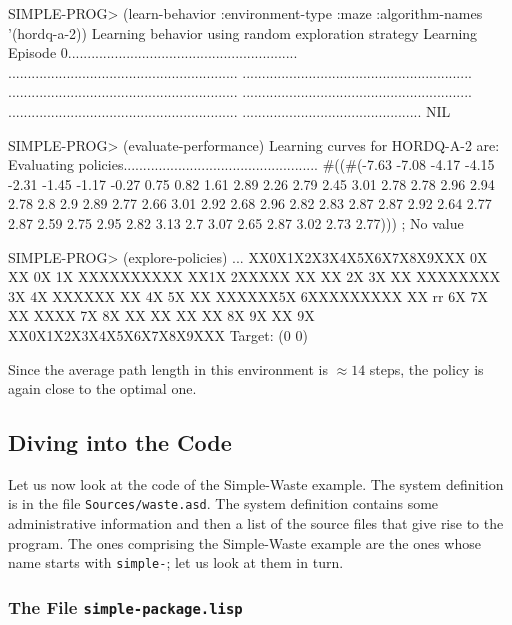 \documentclass[a4paper]{amsart}
\begin{document}
\begin{Code}
  SIMPLE-PROG> (learn-behavior :environment-type :maze :algorithm-names '(hordq-a-2))
  Learning behavior using random exploration strategy
  Learning
  Episode
  0...........................................................
   ...........................................................
   ...........................................................
   ...........................................................
   ...........................................................
   ...........................................................
   ..............................................
  NIL

  SIMPLE-PROG> (evaluate-performance)  
  Learning curves for HORDQ-A-2 are:
  Evaluating policies..................................................
  #((#(-7.63 -7.08 -4.17 -4.15 -2.31 -1.45
       -1.17 -0.27 0.75 0.82 1.61 2.89
       2.26 2.79 2.45 3.01 2.78 2.78 2.96
       2.94 2.78 2.8 2.9 2.89 2.77 2.66
       3.01 2.92 2.68 2.96 2.82 2.83 2.87
       2.87 2.92 2.64 2.77 2.87 2.59 2.75
       2.95 2.82 3.13 2.7 3.07 2.65 2.87 3.02 2.73 2.77)))
  ; No value

  SIMPLE-PROG> (explore-policies)
  \lsq...\rsq
  XX0X1X2X3X4X5X6X7X8X9XXX
  0X      XX            0X
  1X      XXXXXXXXXX  XX1X
  2XXXXX  XX  XX        2X
  3X      XX  XXXXXXXX  3X
  4X  XXXXXX  XX        4X
  5X          XX  XXXXXX5X
  6XXXXXXXXX  XX    rr  6X
  7X  XX      XXXX      7X
  8X  XX  XX  XX  XX    8X
  9X      XX            9X
  XX0X1X2X3X4X5X6X7X8X9XXX
  Target: (0 0)
\end{Code}
Since the average path length in this environment is $\approx 14$
steps, the policy is again close to the optimal one.

\subsection{Diving into the Code}
\label{sec:diving-into-code}

Let us now look at the code of the Simple-Waste example.  The system
definition is in the file \texttt{Sources/waste.asd}.  The system
definition contains some administrative information and then a list of
the source files that give rise to the program.  The ones comprising
the Simple-Waste example are the ones whose name starts with
\texttt{simple-}; let us look at them in turn.

\subsubsection{The File \texttt{simple-package.lisp}}
\label{sec:file-simple-package.lisp} 
\end{document}

